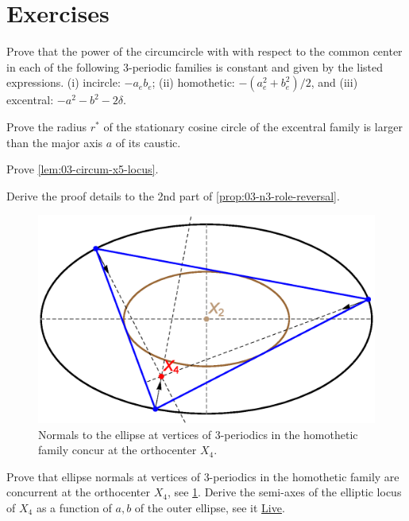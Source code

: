 
\section{Exercises}

\begin{exercise}
 \label{ex:03-power-euler} 
Prove that the power of the circumcircle with with respect to the common center in each of the following 3-periodic families is constant and given by the listed expressions. (i) incircle: $-a_e b_e$; (ii) homothetic: $-({a_e^2+b_e^2})/{2}$, and (iii) excentral: $-a^2-b^2-2\delta$. 
\end{exercise}

\begin{exercise}
\label{ex:03-cosine-circle}
Prove the radius $r^*$ of the stationary cosine circle of the excentral family is larger than the major axis $a$ of its caustic. 
\end{exercise}


\begin{exercise}
Prove \cref{lem:03-circum-x5-locus}.
\label{ex:03-circum-x5-locus}
\end{exercise}

\begin{exercise}
Derive the proof details to the 2nd part of \cref{prop:03-n3-role-reversal}.
\end{exercise}

\begin{figure}
    \centering
    \includegraphics[width=.6\textwidth]{chap_03/pics/pics_03_280_homoth_x4.eps}
    \caption{Normals to the ellipse at vertices of 3-periodics in the homothetic family concur at the orthocenter $X_4$.}
    \label{fig:03-homoth-x4}
\end{figure}

\begin{exercise}
Prove that ellipse normals at vertices of 3-periodics in the homothetic family are concurrent at the orthocenter $X_4$, see \cref{fig:03-homoth-x4}. Derive the semi-axes of the elliptic locus of $X_4$ as a function of $a,b$ of the outer ellipse, see it \href{https://bit.ly/3fpESjh}{Live}.  
\label{ex:03-homoth-x4}
\end{exercise}

